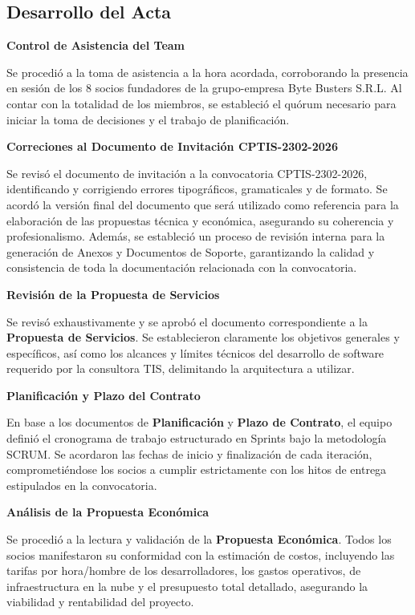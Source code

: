 \newpage
\subsection{Desarrollo del Acta}

\noindent \textbf{Control de Asistencia del Team}\par
Se procedió a la toma de asistencia a la hora acordada, corroborando la presencia en sesión de los 8 socios fundadores de la grupo-empresa Byte Busters S.R.L. Al contar con la totalidad de los miembros, se estableció el quórum necesario para iniciar la toma de decisiones y el trabajo de planificación.

\vspace*{0.5cm}
\noindent \textbf{Correciones al Documento de Invitación CPTIS-2302-2026}\par
Se revisó el documento de invitación a la convocatoria CPTIS-2302-2026, identificando y corrigiendo errores tipográficos, gramaticales y de formato. Se acordó la versión final del documento que será utilizado como referencia para la elaboración de las propuestas técnica y económica, asegurando su coherencia y profesionalismo. Además, se estableció un proceso de revisión interna para la generación de Anexos y Documentos de Soporte, garantizando la calidad y consistencia de toda la documentación relacionada con la convocatoria.\par

\vspace*{0.5cm}
\noindent \textbf{Revisión de la Propuesta de Servicios}\par
Se revisó exhaustivamente y se aprobó el documento correspondiente a la \textbf{Propuesta de Servicios}. Se establecieron claramente los objetivos generales y específicos, así como los alcances y límites técnicos del desarrollo de software requerido por la consultora TIS, delimitando la arquitectura a utilizar.

\vspace*{0.5cm}
\noindent \textbf{Planificación y Plazo del Contrato}\par
En base a los documentos de \textbf{Planificación} y \textbf{Plazo de Contrato}, el equipo definió el cronograma de trabajo estructurado en Sprints bajo la metodología SCRUM. Se acordaron las fechas de inicio y finalización de cada iteración, comprometiéndose los socios a cumplir estrictamente con los hitos de entrega estipulados en la convocatoria.

\vspace*{0.5cm}
\noindent \textbf{Análisis de la Propuesta Económica}\par
Se procedió a la lectura y validación de la \textbf{Propuesta Económica}. Todos los socios manifestaron su conformidad con la estimación de costos, incluyendo las tarifas por hora/hombre de los desarrolladores, los gastos operativos, de infraestructura en la nube y el presupuesto total detallado, asegurando la viabilidad y rentabilidad del proyecto.

